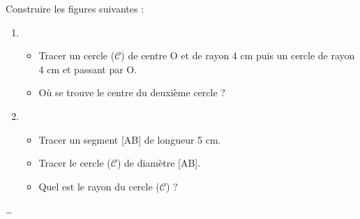\begin{exercice*}
   Construire les figures suivantes :
   \begin{enumerate}
      \item
      \begin{itemize}
         \item Tracer un cercle ($\mathcal{C}$) de centre O et de rayon 4 cm puis un cercle de rayon 4 cm et passant par O.
         \item Où se trouve le centre du deuxième cercle ?
      \end{itemize}
      \item
      \begin{itemize}
         \item Tracer un segment [AB] de longueur 5 cm.
         \item Tracer le cercle ($\mathcal{C}$) de diamètre [AB].
         \item Quel est le rayon du cercle ($\mathcal{C}$) ?
      \end{itemize}
   \end{enumerate}
 \end{exercice*} 
 \begin{corrige}
    \dots
 \end{corrige}
 
